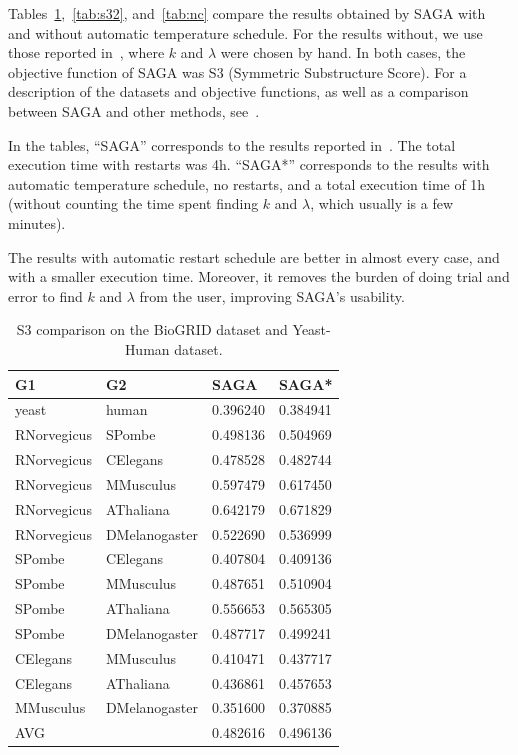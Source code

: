 \documentclass[]{article}
\begin{document}
Tables~\ref{tab:s3},~\ref{tab:s32}, and~\ref{tab:nc} compare the results obtained by SAGA with and without automatic temperature schedule. For the results without, we use those reported in~\cite{SAGA}, where $k$ and $\lambda$ were chosen by hand. In both cases, the objective function of SAGA was S3 (Symmetric Substructure Score). For a description of the datasets and objective functions, as well as a comparison between SAGA and other methods, see~\cite{SAGA}.

In the tables, ``SAGA'' corresponds to the results reported in~\cite{SAGA}. The total execution time with restarts was 4h. ``SAGA*'' corresponds to the results with automatic temperature schedule, no restarts, and a total execution time of 1h (without counting the time spent finding $k$ and $\lambda$, which usually is a few minutes).

The results with automatic restart schedule are better in almost every case, and with a smaller execution time. Moreover, it removes the burden of doing trial and error to find $k$ and $\lambda$ from the user, improving SAGA's usability.
  
\begin{table}
\centering
\caption{S3 comparison on the BioGRID dataset and Yeast-Human dataset.}
\label{tab:s3}
\begin{tabular}{llll}
G1          & G2            & SAGA  & SAGA* \\ \hline
yeast       & human         & 0.396240 & 0.384941     \\
RNorvegicus & SPombe        & 0.498136 & 0.504969     \\
RNorvegicus & CElegans      & 0.478528 & 0.482744     \\
RNorvegicus & MMusculus     & 0.597479 & 0.617450     \\
RNorvegicus & AThaliana     & 0.642179 & 0.671829     \\
RNorvegicus & DMelanogaster & 0.522690 & 0.536999     \\
SPombe      & CElegans      & 0.407804 & 0.409136     \\
SPombe      & MMusculus     & 0.487651 & 0.510904     \\
SPombe      & AThaliana     & 0.556653 & 0.565305     \\
SPombe      & DMelanogaster & 0.487717 & 0.499241     \\
CElegans    & MMusculus     & 0.410471 & 0.437717     \\
CElegans    & AThaliana     & 0.436861 & 0.457653     \\
MMusculus   & DMelanogaster & 0.351600 & 0.370885     \\
AVG         &               & 0.482616 & 0.496136    
\end{tabular}
\end{table}
\end{document}
